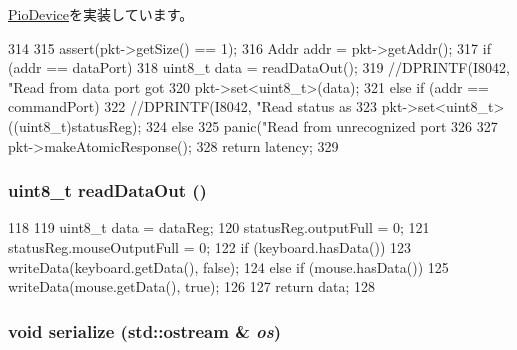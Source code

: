 \hyperlink{classPioDevice_a842312590432036092c422c87a442358}{PioDevice}を実装しています。


\begin{DoxyCode}
314 {
315     assert(pkt->getSize() == 1);
316     Addr addr = pkt->getAddr();
317     if (addr == dataPort) {
318         uint8_t data = readDataOut();
319         //DPRINTF(I8042, "Read from data port got %
320         pkt->set<uint8_t>(data);
321     } else if (addr == commandPort) {
322         //DPRINTF(I8042, "Read status as %
323         pkt->set<uint8_t>((uint8_t)statusReg);
324     } else {
325         panic("Read from unrecognized port %
326     }
327     pkt->makeAtomicResponse();
328     return latency;
329 }
\end{DoxyCode}
\hypertarget{classX86ISA_1_1I8042_a1ba9c6a2a23bdea21924e02dc6cf9d22}{
\subsubsection[{readDataOut}]{\setlength{\rightskip}{0pt plus 5cm}uint8\_\-t readDataOut ()}}
\label{classX86ISA_1_1I8042_a1ba9c6a2a23bdea21924e02dc6cf9d22}



\begin{DoxyCode}
118 {
119     uint8_t data = dataReg;
120     statusReg.outputFull = 0;
121     statusReg.mouseOutputFull = 0;
122     if (keyboard.hasData()) {
123         writeData(keyboard.getData(), false);
124     } else if (mouse.hasData()) {
125         writeData(mouse.getData(), true);
126     }
127     return data;
128 }
\end{DoxyCode}
\hypertarget{classX86ISA_1_1I8042_a53e036786d17361be4c7320d39c99b84}{
\subsubsection[{serialize}]{\setlength{\rightskip}{0pt plus 5cm}void serialize (std::ostream \& {\em os})}}
\label{classX86ISA_1_1I8042_a53e036786d17361be4c7320d39c99b84}


